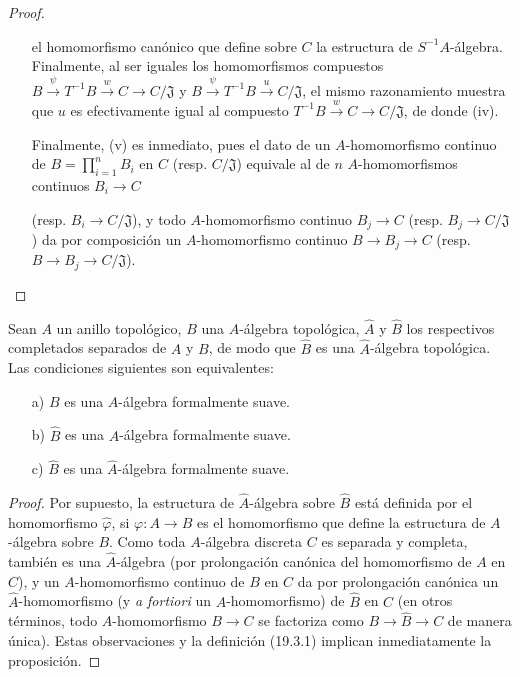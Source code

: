 \begin{proof}
\begin{enumerate}
  el homomorfismo canónico que define sobre $C$ la estructura de
  $S^{-1}A$-álgebra. Finalmente, al ser iguales los homomorfismos compuestos
  $B\xrightarrow{\psi}T^{-1}B\xrightarrow{w}C\to C/\mathfrak J$ y
  $B\xrightarrow{\psi}T^{-1}B\xrightarrow{u}C/\mathfrak J$, el mismo
  razonamiento muestra que $u$ es efectivamente igual al compuesto
  $T^{-1}B\xrightarrow{w}C\to C/\mathfrak J$, de donde (iv).
  \item[] Finalmente, (v) es inmediato, pues el dato de un $A$-homomorfismo
  continuo de $B=\prod_{i=1}^n B_i$ en $C$ (resp. $C/\mathfrak J$)
  equivale al de $n$ $A$-homomorfismos continuos $B_i\to C$

  (resp. $B_i\to C/\mathfrak J$), y todo $A$-homomorfismo continuo
  $B_j\to C$ (resp. $B_j\to C/\mathfrak J$) da por composición un
  $A$-homomorfismo continuo $B\to B_j\to C$
  (resp. $B\to B_j\to C/\mathfrak J$).
\end{enumerate}
\end{proof}



\begin{proposition}[19.3.6]
\label{0.19.3.6-fr}
Sean $A$ un anillo topológico, $B$ una $A$-álgebra topológica, $\hat A$
y $\hat B$ los respectivos completados separados de $A$ y $B$, de modo que
$\hat B$ es una $\hat A$-álgebra topológica. Las condiciones siguientes
son equivalentes:
\begin{enumerate}
  \item[\textup{a)}] $B$ es una $A$-álgebra formalmente suave.
  \item[\textup{b)}] $\hat B$ es una $A$-álgebra formalmente suave.
  \item[\textup{c)}] $\hat B$ es una $\hat A$-álgebra formalmente suave.
\end{enumerate}
\end{proposition}

\begin{proof}
Por supuesto, la estructura de $\hat A$-álgebra sobre $\hat B$ está definida
por el homomorfismo $\hat\varphi$, si $\varphi:A\to B$ es
el homomorfismo que define la estructura de $A$-álgebra sobre $B$. Como toda
$A$-álgebra discreta $C$ es separada y completa, también es una
$\hat A$-álgebra (por prolongación canónica del homomorfismo de $A$ en
$C$), y un $A$-homomorfismo continuo de $B$ en $C$ da por prolongación
canónica un $\hat A$-homomorfismo (y \emph{a fortiori} un
$A$-homomorfismo) de $\hat B$ en $C$ (en otros términos, todo
$A$-homomorfismo $B\to C$ se factoriza como $B\to\hat B\to C$ de manera
única). Estas observaciones y la definición (19.3.1) implican inmediatamente la
proposición.
\end{proof}

